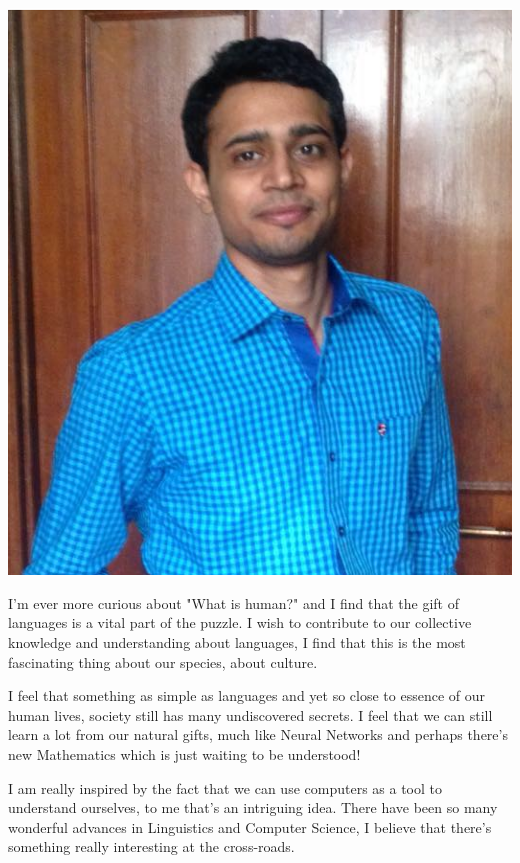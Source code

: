 \documentclass[11pt, a4paper]{awesome-cv}
\begin{document}
\makecvheader







\makelettertitle



\begin{minipage}{1.0\textwidth}
\centering
\includegraphics[height=2.2 in,width=2 in]{profile_colored.png}
\end{minipage}

\begin{cvletter}



I'm ever more curious about "What is human?" and I find that the gift of languages is a vital part of the puzzle. I wish to contribute to our collective knowledge and understanding about languages, I find that this is the most fascinating thing about our species, about culture.

I feel that something as simple as languages and yet so close to essence of our human lives, society still has many undiscovered secrets. I feel that we can still learn a lot from our natural gifts, much like Neural Networks and perhaps there's new Mathematics which is just waiting to be understood!

I am really inspired by the fact that we can use computers as a tool to understand ourselves, to me that's an intriguing idea. There have been so many wonderful advances in Linguistics and Computer Science, I believe that there's something really interesting at the cross-roads.

\end{cvletter}

\makeletterclosing
\end{document}
